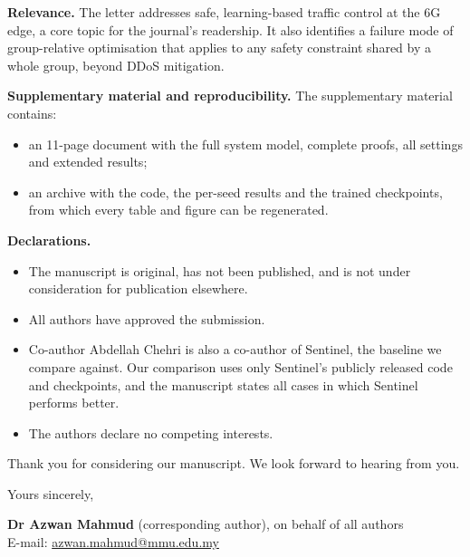 \documentclass[11pt,a4paper]{article}
\begin{document}
\textbf{Relevance.} The letter addresses safe, learning-based traffic control at the 6G edge, a core topic for the journal's readership. It also identifies a failure mode of group-relative optimisation that applies to any safety constraint shared by a whole group, beyond DDoS mitigation.

\textbf{Supplementary material and reproducibility.} The supplementary material contains:
\begin{itemize}[nosep,leftmargin=1.4em]
\item an 11-page document with the full system model, complete proofs, all settings and extended results;
\item an archive with the code, the per-seed results and the trained checkpoints, from which every table and figure can be regenerated.
\end{itemize}

\textbf{Declarations.}
\begin{itemize}[nosep,leftmargin=1.4em]
\item The manuscript is original, has not been published, and is not under consideration for publication elsewhere.
\item All authors have approved the submission.
\item Co-author Abdellah Chehri is also a co-author of Sentinel, the baseline we compare against. Our comparison uses only Sentinel's publicly released code and checkpoints, and the manuscript states all cases in which Sentinel performs better.
\item The authors declare no competing interests.
\end{itemize}

Thank you for considering our manuscript. We look forward to hearing from you.

Yours sincerely,

\textbf{Dr Azwan Mahmud} (corresponding author), on behalf of all authors\\
E-mail: \href{mailto:azwan.mahmud@mmu.edu.my}{azwan.mahmud@mmu.edu.my}
\end{document}

